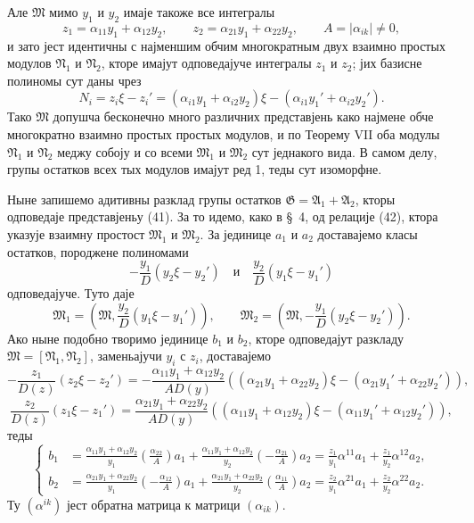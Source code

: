 ﻿\documentclass[11pt]{article}
\begin{document}
Але \(\mathfrak M\) мимо \(y_1\) и \(y_2\) имаје такоже все интегралы
\[
 z_1=\alpha_{11}y_1+\alpha_{12}y_2,
 \qquad
 z_2=\alpha_{21}y_1+\alpha_{22}y_2,
 \qquad
 A=|\alpha_{ik}|\ne0,
\]
и зато јест идентичны с најменшим обчим многократным двух взаимно простых модулов \(\mathfrak N_1\) и \(\mathfrak N_2\), кторе имајут одповедајуче интегралы \(z_1\) и \(z_2\); јих базисне полиномы сут даны чрез
\[
 N_i=z_i\xi-z_i'=(\alpha_{i1}y_1+\alpha_{i2}y_2)\xi-(\alpha_{i1}y_1'+\alpha_{i2}y_2').
\]
Тако \(\mathfrak M\) допушча бесконечно много различних представјень како најмене обче многократно взаимно простых простых модулов, и по Теорему VII оба модулы \(\mathfrak N_1\) и \(\mathfrak N_2\) меджу собоју и со всеми \(\mathfrak M_1\) и \(\mathfrak M_2\) сут једнакого вида. В самом делу, групы остатков всех тых модулов имајут ред 1, теды сут изоморфне.

Ныне запишемо адитивны разклад групы остатков \(\mathfrak G=\mathfrak A_1+\mathfrak A_2\), кторы одповедаје представјеньу (41). За то идемо, како в \S~4, од релације (42), ктора указује взаимну простост \(\mathfrak M_1\) и \(\mathfrak M_2\). За јединице \(a_1\) и \(a_2\) доставајемо класы остатков, породжене полиномами
\[
 -\frac{y_1}{D}(y_2\xi-y_2')
 \quad\text{и}\quad
 \frac{y_2}{D}(y_1\xi-y_1')
\]
одповедајуче. Туто даје
\[
 \mathfrak M_1=\left(\mathfrak M,\frac{y_2}{D}(y_1\xi-y_1')\right),
 \qquad
 \mathfrak M_2=\left(\mathfrak M,-\frac{y_1}{D}(y_2\xi-y_2')\right).
\]
Ако ныне подобно творимо јединице \(b_1\) и \(b_2\), кторе одповедајут разкладу \(\mathfrak M=[\mathfrak N_1,
\mathfrak N_2]\), заменьајучи \(y_i\) с \(z_i\), доставајемо
\[
 -\frac{z_1}{D(z)}(z_2\xi-z_2')
 =-\frac{\alpha_{11}y_1+\alpha_{12}y_2}{AD(y)}
 ((\alpha_{21}y_1+\alpha_{22}y_2)\xi-(\alpha_{21}y_1'+\alpha_{22}y_2')),
\]
\[
 \frac{z_2}{D(z)}(z_1\xi-z_1')
 =\frac{\alpha_{21}y_1+\alpha_{22}y_2}{AD(y)}
 ((\alpha_{11}y_1+\alpha_{12}y_2)\xi-(\alpha_{11}y_1'+\alpha_{12}y_2')),
\]
теды
\begin{equation}
\left\{
\begin{aligned}
 b_1&=\frac{\alpha_{11}y_1+\alpha_{12}y_2}{y_1}
 \left(\frac{\alpha_{22}}{A}\right)a_1
 +\frac{\alpha_{11}y_1+\alpha_{12}y_2}{y_2}
 \left(-\frac{\alpha_{21}}{A}\right)a_2
 =\frac{z_1}{y_1}\alpha^{11}a_1+\frac{z_1}{y_2}\alpha^{12}a_2,\\
 b_2&=\frac{\alpha_{21}y_1+\alpha_{22}y_2}{y_1}
 \left(-\frac{\alpha_{12}}{A}\right)a_1
 +\frac{\alpha_{21}y_1+\alpha_{22}y_2}{y_2}
 \left(\frac{\alpha_{11}}{A}\right)a_2
 =\frac{z_2}{y_1}\alpha^{21}a_1+\frac{z_2}{y_2}\alpha^{22}a_2.
\end{aligned}\right.
\tag{43}
\end{equation}
Ту \((\alpha^{ik})\) јест обратна матрица к матрици \((\alpha_{ik})\).
\end{document}
